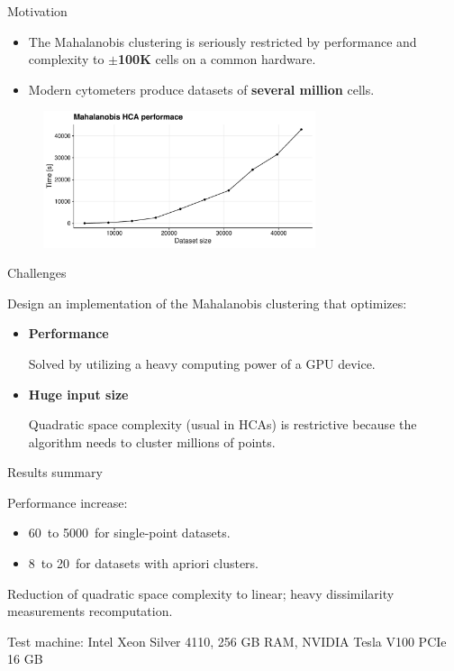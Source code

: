 \documentclass[10pt]{beamer}
\begin{document}
\begin{frame}{Motivation}
	\begin{itemize}
		\item The Mahalanobis clustering is seriously restricted by performance and complexity to \textbf{$\pm$100K} cells on a common hardware.
	
		\item Modern cytometers produce datasets of \textbf{several million} cells.
	\end{itemize}
	\begin{figure}
	\includegraphics[width=8cm]{img/scalability}
	\end{figure}

\end{frame}

\begin{frame}{Challenges}
	
	Design an implementation of the Mahalanobis clustering that optimizes:
	\begin{itemize}
		\item \textbf{Performance}
		
		Solved by utilizing a heavy computing power of a GPU device.
		\item \textbf{Huge input size}
		
		Quadratic space complexity (usual in HCAs) is restrictive because the algorithm needs to cluster millions of points.
	\end{itemize}
	
\end{frame}

\begin{frame}{Results summary}
	
	Performance increase:
	\begin{itemize}
		\item 60\texttimes\ to 5000\texttimes\ for single-point datasets.
		\item 8\texttimes\ to 20\texttimes\ for datasets with apriori clusters.
	\end{itemize}

	Reduction of quadratic space complexity to linear; heavy dissimilarity measurements recomputation.
	
	Test machine: Intel Xeon Silver 4110, 256 GB
	RAM, NVIDIA Tesla V100 PCIe 16 GB
	
\end{frame}
\end{document}
